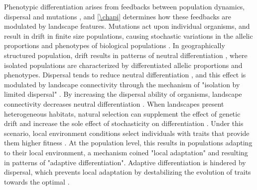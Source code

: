 Phenotypic differentiation arises from feedbacks between population dynamics, dispersal and mutations \citep{hamilton2021population}, and \cref{\chapi} determines how these feedbacks are modulated by landscape features.
% 
Mutations act upon individual organisms, and result in drift in finite size populations, causing stochastic variations in the allelic proportions and phenotypes of biological populations \citep{Slatkin1987a}.
% 
% 
In geographically structured population, drift results in patterns of neutral differentiation \citep{Slatkin1987a}, where isolated populations are characterized by differentiated allelic proportions and phenotypes. 
% 
Dispersal tends to reduce neutral differentiation \citep{Slatkin1987a}, and this effect is modulated by landscape connectivity \citep{Wright1943,McRae2006,McRae2007} through the mechanism of "isolation by limited dispersal" \citep{Orsini2013}. By increasing the dispersal ability of organisms, landscape connectivity decreases neutral differentiation \citep{Lande1991}.
% 
When landscapes present heterogeneous habitats, natural selection can supplement the effect of genetic drift and increase the sole effect of stochasticity on differentiation \citep{fisher1958genetical}. Under this scenario, local environment conditions select individuals with traits that provide them higher fitness \citep{Gaither2018}. At the population level, this results in populations adapting to their local environment, a mechanism coined "local adaptation" \citep{Kawecki2004} and resulting in patterns of "adaptive differentiation". 
% 
% 
Adaptive differentiation is hindered by dispersal, which prevents local adaptation by destabilizing the evolution of traits towards the optimal \citep{Meszena1997,Debarre2013,Mirrahimi2020}.
% 
% 
